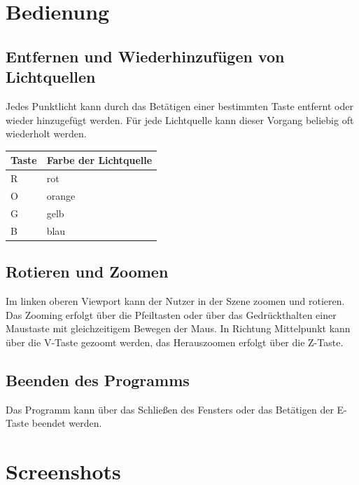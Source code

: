 \documentclass{scrartcl}
\begin{document}
    \section{Bedienung}
        \subsection{Entfernen und Wiederhinzufügen von Lichtquellen}
            Jedes Punktlicht kann durch das Betätigen einer bestimmten Taste entfernt 
            oder wieder hinzugefügt werden. Für jede Lichtquelle kann dieser Vorgang 
            beliebig oft wiederholt werden. \par
        \begin{tabular}{| l | l |}
            \hline
            Taste & Farbe der Lichtquelle \\ \hline
            R & rot \\ \hline
            O & orange \\ \hline
            G & gelb \\ \hline
            B & blau \\ \hline
        \end{tabular}

        \subsection{Rotieren und Zoomen}
            Im linken oberen Viewport kann der Nutzer in der Szene zoomen und rotieren. Das Zooming 
            erfolgt über die Pfeiltasten oder über das Gedrückthalten einer Maustaste mit 
            gleichzeitigem Bewegen der Maus. In Richtung Mittelpunkt kann über die V-Taste 
            gezoomt werden, das Herauszoomen erfolgt über die Z-Taste.

        \subsection{Beenden des Programms}
            Das Programm kann über das Schließen des Fensters oder das Betätigen der 
            E-Taste beendet werden.
    \newpage
    \section{Screenshots}
\end{document}
